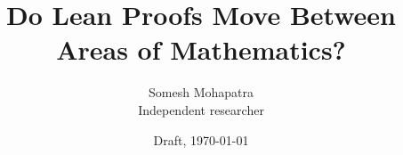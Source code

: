 \documentclass{article}
\newif\ificmlstyle
\newcommand{\papertitle}{Do Lean Proofs Move Between Areas of Mathematics?}
\begin{document}
\ificmlstyle
  \twocolumn[
    \icmltitle{\papertitle}
    \begin{icmlauthorlist}
      \icmlauthor{Somesh Mohapatra}{ind}
    \end{icmlauthorlist}
    \icmlaffiliation{ind}{Independent researcher}
    \icmlcorrespondingauthor{Somesh Mohapatra}{TODO}
    \icmlkeywords{theorem proving, Lean, Markov state models, proof search}
    \vskip 0.3in
  ]
  \printAffiliationsAndNotice{}
\else
  \title{\papertitle}
  \author{Somesh Mohapatra\\Independent researcher}
  \date{Draft, \today}
  \maketitle
\fi

\begin{abstract}

\end{abstract}











\ificmlstyle
  
\else
  
\fi

\newpage
\appendix
\ificmlstyle\onecolumn\fi

\end{document}
